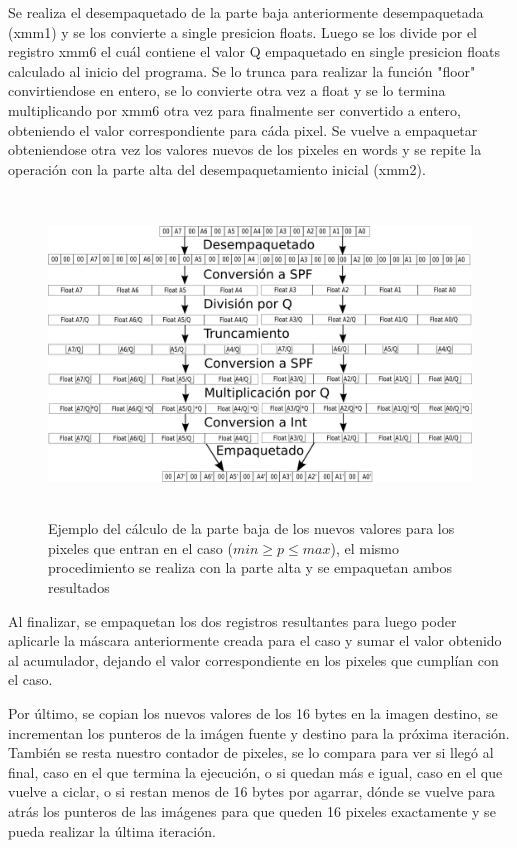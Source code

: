 Se realiza el desempaquetado de la parte baja anteriormente desempaquetada (xmm1) y se los convierte a single presicion floats. Luego se los divide por el registro xmm6 el cuál contiene el valor Q empaquetado en single presicion floats calculado al inicio del programa. Se lo trunca para realizar la función "floor" convirtiendose en entero, se lo convierte otra vez a float y se lo termina multiplicando por xmm6 otra vez para finalmente ser convertido a entero, obteniendo el valor correspondiente para cáda pixel. Se vuelve a empaquetar obteniendose otra vez los valores nuevos de los pixeles en words y se repite la operación con la parte alta del desempaquetamiento inicial (xmm2).

\begin{figure}[H]
\centering
\includegraphics[width=150mm, height=85mm]{calcq.png}
\caption{Ejemplo del cálculo de la parte baja de los nuevos valores para los pixeles que entran en el caso ($min \geq p \leq max$), el mismo procedimiento se realiza con la parte alta y se empaquetan ambos resultados}
\label{overflow}
\end{figure}

Al finalizar, se empaquetan los dos registros resultantes para luego poder aplicarle la máscara anteriormente creada para el caso y sumar el valor obtenido al acumulador, dejando el valor correspondiente en los pixeles que cumplían con el caso.

Por último, se copian los nuevos valores de los 16 bytes en la imagen destino, se incrementan los punteros de la imágen fuente y destino para la próxima iteración. También se resta nuestro contador de pixeles, se lo compara para ver si llegó al final, caso en el que termina la ejecución, o si quedan más e igual, caso en el que vuelve a ciclar, o si restan menos de 16 bytes por agarrar, dónde se vuelve para atrás los punteros de las imágenes para que queden 16 pixeles exactamente y se pueda realizar la última iteración.



